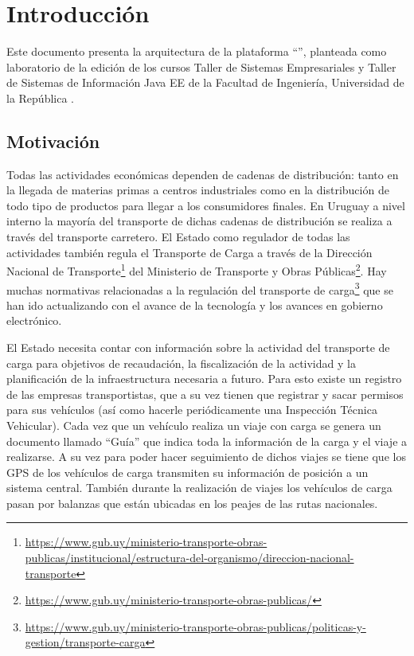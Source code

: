 \section{Introducción}

Este documento presenta la arquitectura de la plataforma \enquote{\solucion}, planteada como laboratorio de la edición \edicion de los cursos Taller de Sistemas Empresariales y Taller de Sistemas de Información Java EE de la Facultad de Ingeniería, Universidad de la República \cite{LINS2026}.

\subsection{Motivación}

Todas las actividades económicas dependen de cadenas de distribución: tanto en la llegada de materias primas a centros industriales como en la distribución de todo tipo de productos para llegar a los consumidores finales. En Uruguay a nivel interno la mayoría del transporte de dichas cadenas de distribución se realiza a través del transporte carretero. El Estado como regulador de todas las actividades también regula el Transporte de Carga a través de la Dirección Nacional de Transporte\footnote{\raggedright\url{https://www.gub.uy/ministerio-transporte-obras-publicas/institucional/estructura-del-organismo/direccion-nacional-transporte}} del Ministerio de Transporte y Obras Públicas\footnote{\raggedright\url{https://www.gub.uy/ministerio-transporte-obras-publicas/}}. Hay muchas normativas relacionadas a la regulación del transporte de carga\footnote{\raggedright\url{https://www.gub.uy/ministerio-transporte-obras-publicas/politicas-y-gestion/transporte-carga}} que se han ido actualizando con el avance de la tecnología y los avances en gobierno electrónico.

El Estado necesita contar con información sobre la actividad del transporte de carga para objetivos de recaudación, la fiscalización de la actividad y la planificación de la infraestructura necesaria a futuro. Para esto existe un registro de las empresas transportistas, que a su vez tienen que registrar y sacar permisos para sus vehículos (así como hacerle periódicamente una Inspección Técnica Vehicular). Cada vez que un vehículo realiza un viaje con carga se genera un documento llamado “Guía” que indica toda la información de la carga y el viaje a realizarse. A su vez para poder hacer seguimiento de dichos viajes se tiene que los GPS de los vehículos de carga transmiten su información de posición a un sistema central. También durante la realización de viajes los vehículos de carga pasan por balanzas que están ubicadas en los peajes de las rutas nacionales.

